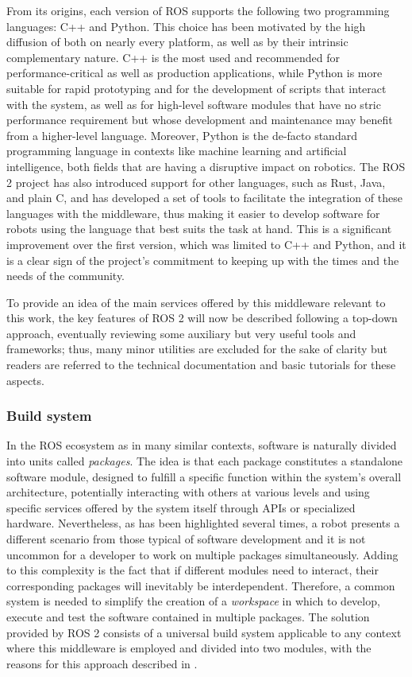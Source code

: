 From its origins, each version of ROS supports the following two programming languages: C++ and Python. This choice has been motivated by the high diffusion of both on nearly every platform, as well as by their intrinsic complementary nature. C++ is the most used and recommended for performance-critical as well as production applications, while Python is more suitable for rapid prototyping and for the development of scripts that interact with the system, as well as for high-level software modules that have no stric performance requirement but whose development and maintenance may benefit from a higher-level language. Moreover, Python is the de-facto standard programming language in contexts like machine learning and artificial intelligence, both fields that are having a disruptive impact on robotics. The ROS 2 project has also introduced support for other languages, such as Rust, Java, and plain C, and has developed a set of tools to facilitate the integration of these languages with the middleware, thus making it easier to develop software for robots using the language that best suits the task at hand. This is a significant improvement over the first version, which was limited to C++ and Python, and it is a clear sign of the project's commitment to keeping up with the times and the needs of the community.

To provide an idea of the main services offered by this middleware relevant to this work, the key features of ROS 2 will now be described following a top-down approach, eventually reviewing some auxiliary but very useful tools and frameworks; thus, many minor utilities are excluded for the sake of clarity but readers are referred to the technical documentation \cite{open_robotics_ros_nodate} and basic tutorials \cite{open_robotics_tutorials_nodate} for these aspects.

\subsubsection{Build system}
\label{sec:ros2_buildsys}
In the ROS ecosystem as in many similar contexts, software is naturally divided into units called \emph{packages}. The idea is that each package constitutes a standalone software module, designed to fulfill a specific function within the system's overall architecture, potentially interacting with others at various levels and using specific services offered by the system itself through APIs or specialized hardware. Nevertheless, as has been highlighted several times, a robot presents a different scenario from those typical of software development and it is not uncommon for a developer to work on multiple packages simultaneously. Adding to this complexity is the fact that if different modules need to interact, their corresponding packages will inevitably be interdependent. Therefore, a common system is needed to simplify the creation of a \emph{workspace} in which to develop, execute and test the software contained in multiple packages. The solution provided by ROS 2 consists of a universal build system applicable to any context where this middleware is employed and divided into two modules, with the reasons for this approach described in \cite{thomas_universal_2017}.


